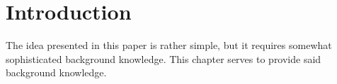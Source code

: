 \chapter{Introduction}

The idea presented in this paper is rather simple, but it requires somewhat
sophisticated background knowledge. This chapter serves to provide said
background knowledge.